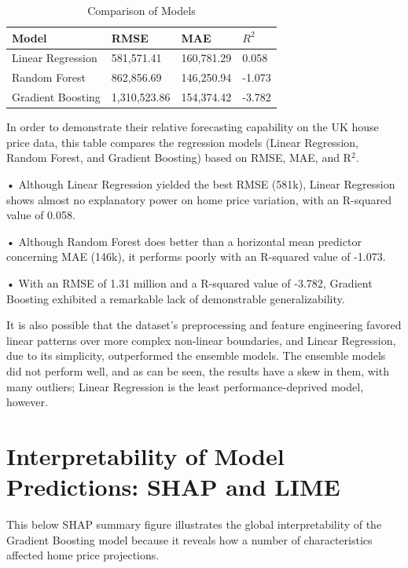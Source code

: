 \documentclass[12pt, a4paper, oneside]{book}
\begin{document}
\begin{table}[htbp]
\centering
\caption{Comparison of Models}
\label{tab:model_comparison_detailed}
\begin{tabular}{|p{3cm}|p{3cm}|p{3cm}|p{3cm}|}
\hline
\textbf{Model} & \textbf{RMSE} & \textbf{MAE} & \textbf{$R^2$} \\
\hline
Linear Regression & 581,571.41 & 160,781.29 & 0.058 \\
\hline
Random Forest & 862,856.69 & 146,250.94 & -1.073 \\
\hline
Gradient Boosting & 1,310,523.86 & 154,374.42 & -3.782 \\
\hline
\end{tabular}
\end{table}

In order to demonstrate their relative forecasting capability on the UK house price data, this table compares the regression models (Linear Regression, Random Forest, and Gradient Boosting) based on RMSE, MAE, and R$^2$.


•	Although Linear Regression yielded the best RMSE (581k), Linear Regression shows almost no explanatory power on home price variation, with an R-squared value of 0.058. 


•	Although Random Forest does better than a horizontal mean predictor concerning MAE (146k), it performs poorly with an R-squared value of -1.073.


•	With an RMSE of 1.31 million and a R-squared value of -3.782, Gradient Boosting exhibited a remarkable lack of demonstrable generalizability.


It is also possible that the dataset’s preprocessing and feature engineering favored linear patterns over more complex non-linear boundaries, and Linear Regression, due to its simplicity, outperformed the ensemble models. The ensemble models did not perform well, and as can be seen, the results have a skew in them, with many outliers; Linear Regression is the least performance-deprived model, however.


\section{Interpretability of Model Predictions: SHAP and LIME}

This below SHAP summary figure illustrates the global interpretability of the Gradient Boosting model because it reveals how a number of characteristics affected home price projections.

\textbf{}
\end{document}

